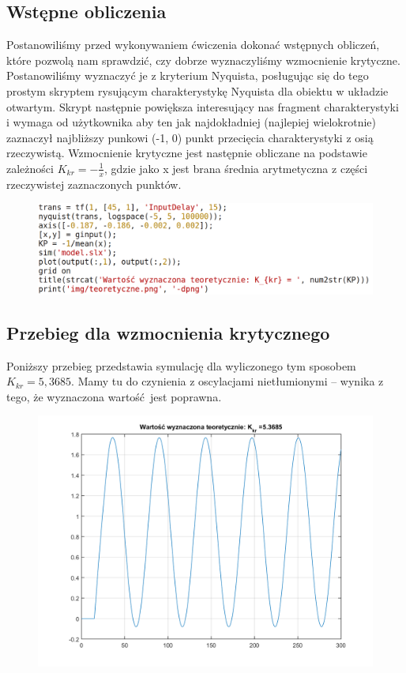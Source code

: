 \documentclass[a4paper, 12pt]{article}
\begin{document}
		\subsection{Wstępne obliczenia}
			Postanowiliśmy przed wykonywaniem ćwiczenia dokonać wstępnych obliczeń, które pozwolą nam sprawdzić, czy dobrze wyznaczyliśmy wzmocnienie krytyczne. Postanowiliśmy wyznaczyć je z kryterium Nyquista, posługując się do tego prostym skryptem rysującym charakterystykę Nyquista dla obiektu w układzie otwartym. Skrypt następnie powiększa interesujący nas fragment charakterystyki i wymaga od użytkownika aby ten jak najdokładniej (najlepiej wielokrotnie) zaznaczył najbliższy punkowi (-1, 0) punkt przecięcia charakterystyki z osią rzeczywistą. Wzmocnienie krytyczne jest następnie obliczane na podstawie zależności $K_{kr} = -\frac{1}{x}$, gdzie jako x jest brana średnia arytmetyczna z części rzeczywistej zaznaczonych punktów.
			\begin{figure}[H]
				\includegraphics[width = \textwidth]{./code/teoria.png}
			\end{figure}
			\noindent
		\subsection{Przebieg dla wzmocnienia krytycznego}
			Poniższy przebieg przedstawia symulację dla wyliczonego tym sposobem $K_{kr} = 5,3685$. Mamy tu do czynienia z oscylacjami nietłumionymi -- wynika z tego, że wyznaczona wartość jest poprawna.
			\begin{figure}[H]
				\centering
				\includegraphics[width = \textwidth]{./img/teoretyczne.png}
			\end{figure}
\end{document}
